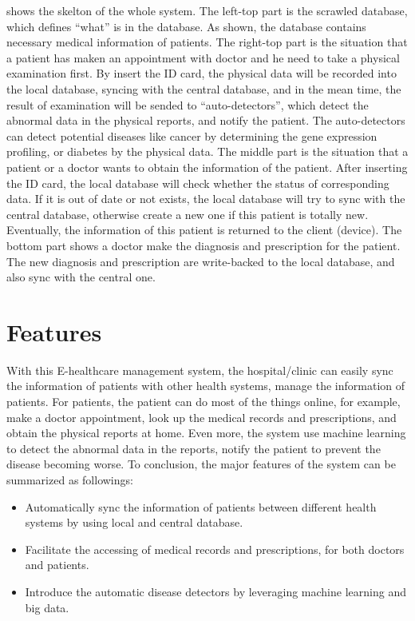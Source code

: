 \documentclass{article}
\begin{document}
   shows the skelton of the whole system. The left-top 
  part is the scrawled database, which defines ``what'' is in the database. 
  As shown, the database contains necessary medical information of patients. 
  The right-top part is the situation that a patient has maken an appointment 
  with doctor and he need to take a physical examination first. By insert the 
  ID card, the physical data will be recorded into the local database, syncing 
  with the central database, and in the mean time, the result of examination 
  will be sended to ``auto-detectors'', which detect the abnormal data in the 
  physical reports, and notify the patient. The auto-detectors can detect 
  potential diseases like cancer by determining the gene expression profiling, 
  or diabetes by the physical data. 
  The middle part is the situation that a patient or a doctor wants to obtain 
  the information of the patient. After inserting the ID card, the local 
  database will check whether the status of corresponding data. If it is out of 
  date or not exists, the local database will try to sync with the central 
  database, otherwise create a new one if this patient is totally new. Eventually, 
  the information of this patient is returned to the client (device). 
  The bottom part shows a doctor make the diagnosis and prescription for the 
  patient. The new diagnosis and prescription are write-backed to the local 
  database, and also sync with the central one. 

\section{Features}
\label{sec:features}

  With this E-healthcare management system, the hospital/clinic can easily 
  sync the information of patients with other health systems, manage 
  the information of patients.
  For patients, the patient can do most of the things online, for example, 
  make a doctor appointment, look up the medical records and prescriptions, 
  and obtain the physical reports at home. Even more, the system use machine 
  learning to detect the abnormal data in the reports, notify the patient 
  to prevent the disease becoming worse. 
  To conclusion, the major features of the system can be summarized as 
  followings: 
  \begin{itemize}
    \item Automatically sync the information of patients between different health systems by using local and central database. 
    \item Facilitate the accessing of medical records and prescriptions, for both doctors and patients. 
    \item Introduce the automatic disease detectors by leveraging machine learning and big data. 
  \end{itemize}
\end{document}
